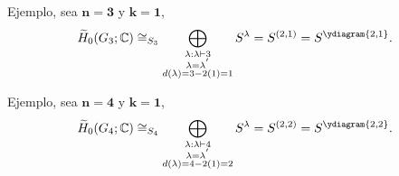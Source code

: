 \documentclass[final,xcolor=svgnames]{beamer}
\begin{document}
\begin{frame}{}
\begin{columns}
\begin{column}{0.5\textwidth}
        \begin{block}{Ejemplo, sea $\boldsymbol{n=3}$ y $\boldsymbol{k=1}$,}
          \begin{equation*}
            \widetilde H_{0}(G_{3};\mathbb{C})\cong_{S_{3}}\bigoplus_{\substack{\lambda:\lambda\vdash 3\\
              \lambda=\lambda^{'}\\d(\lambda)=3-2(1)=1}} S^{\lambda}=S^{(2,1)}=S^{\ydiagram{2,1}}.
          \end{equation*}
       \end{block}
       
       \begin{block}{Ejemplo, sea $\boldsymbol{n=4}$ y $\boldsymbol{k=1}$,}
         \begin{equation*}
           \widetilde H_{0}(G_{4};\mathbb{C})\cong_{S_{4}}\bigoplus_{\substack{\lambda:\lambda\vdash 4\\
               \lambda=\lambda^{'}\\d(\lambda)=4-2(1)=2}} S^{\lambda}=S^{(2,2)}=S^{\ydiagram{2,2}}.
         \end{equation*}
       \end{block}


\end{column}
\end{columns}
\end{frame}
\end{document}
